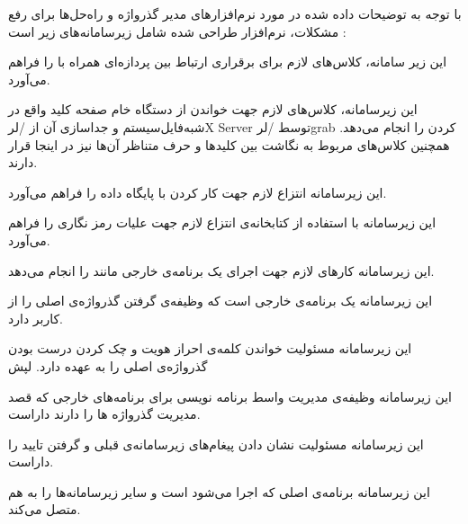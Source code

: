 

با توجه به توضیحات داده شده در مورد نرم‌افزارهای مدیر گذرواژه و راه‌حل‌ها برای رفع مشکلات، نرم‌افزار طراحی شده شامل زیرسامانه‌های زیر است :



این زیر سامانه، کلاس‌های لازم برای برقراری ارتباط بین پردازه‌ای همراه با  را فراهم می‌آورد. 


این زیرسامانه، کلاس‌های لازم جهت خواندن از دستگاه خام صفحه کلید واقع در شبه‌فایل‌سیستم  و جداسازی آن از /لر{X Server} توسط /لر{grab} کردن را انجام می‌دهد. همچنین کلاس‌های مربوط به نگاشت بین کلید‌ها و حرف متناظر آن‌ها نیز در اینجا قرار دارند.


این زیرسامانه انتزاع لازم جهت کار کردن با پایگاه داده را فراهم می‌آورد. 


این زیرسامانه با استفاده از کتابخانه‌ی  انتزاع لازم جهت علیات رمز نگاری را فراهم می‌آورد.


این زیرسامانه کارهای لازم جهت اجرای یک برنامه‌ی خارجی مانند  را انجام می‌دهد. 


این زیرسامانه یک برنامه‌ی خارجی است که وظیفه‌ی گرفتن گذرواژه‌ی اصلی را از کاربر دارد.


این زیرسامانه مسئولیت خواندن کلمه‌ی احراز هویت و چک کردن درست بودن گذرواژه‌ی اصلی را به عهده دارد.
لپش

این زیرسامانه وظیفه‌ی مدیریت واسط برنامه نویسی برای برنامه‌های خارجی که قصد مدیریت گذرواژه ها را دارند داراست.


این زیرسامانه مسئولیت نشان دادن پیغام‌های زیرسامانه‌ی قبلی و گرفتن تایید را داراست.


این زیرسامانه برنامه‌ی اصلی که اجرا می‌شود است و سایر زیر‌سامانه‌ها را به هم متصل می‌کند.


